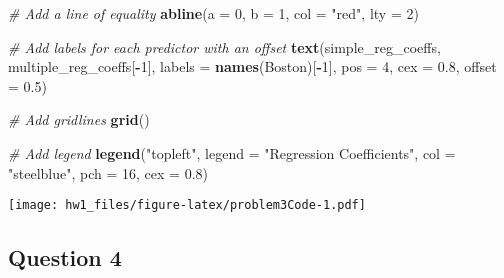 \documentclass[
]{article}
\newenvironment{Shaded}{\begin{snugshade}}{\end{snugshade}}
\newcommand{\AttributeTok}[1]{\textcolor[rgb]{0.13,0.29,0.53}{#1}}
\newcommand{\CommentTok}[1]{\textcolor[rgb]{0.56,0.35,0.01}{\textit{#1}}}
\newcommand{\DecValTok}[1]{\textcolor[rgb]{0.00,0.00,0.81}{#1}}
\newcommand{\FloatTok}[1]{\textcolor[rgb]{0.00,0.00,0.81}{#1}}
\newcommand{\FunctionTok}[1]{\textcolor[rgb]{0.13,0.29,0.53}{\textbf{#1}}}
\newcommand{\NormalTok}[1]{#1}
\newcommand{\SpecialCharTok}[1]{\textcolor[rgb]{0.81,0.36,0.00}{\textbf{#1}}}
\newcommand{\StringTok}[1]{\textcolor[rgb]{0.31,0.60,0.02}{#1}}
\begin{document}
\begin{Shaded}
\begin{Highlighting}[]
\CommentTok{\# Add a line of equality}
\FunctionTok{abline}\NormalTok{(}\AttributeTok{a =} \DecValTok{0}\NormalTok{, }\AttributeTok{b =} \DecValTok{1}\NormalTok{, }\AttributeTok{col =} \StringTok{"red"}\NormalTok{, }\AttributeTok{lty =} \DecValTok{2}\NormalTok{)}

\CommentTok{\# Add labels for each predictor with an offset}
\FunctionTok{text}\NormalTok{(simple\_reg\_coeffs, multiple\_reg\_coeffs[}\SpecialCharTok{{-}}\DecValTok{1}\NormalTok{], }\AttributeTok{labels =} \FunctionTok{names}\NormalTok{(Boston)[}\SpecialCharTok{{-}}\DecValTok{1}\NormalTok{], }\AttributeTok{pos =} \DecValTok{4}\NormalTok{, }\AttributeTok{cex =} \FloatTok{0.8}\NormalTok{, }\AttributeTok{offset =} \FloatTok{0.5}\NormalTok{)}

\CommentTok{\# Add gridlines}
\FunctionTok{grid}\NormalTok{()}

\CommentTok{\# Add legend}
\FunctionTok{legend}\NormalTok{(}\StringTok{"topleft"}\NormalTok{, }\AttributeTok{legend =} \StringTok{"Regression Coefficients"}\NormalTok{, }\AttributeTok{col =} \StringTok{"steelblue"}\NormalTok{, }\AttributeTok{pch =} \DecValTok{16}\NormalTok{, }\AttributeTok{cex =} \FloatTok{0.8}\NormalTok{)}
\end{Highlighting}
\end{Shaded}

\texttt{[image: hw1\_files/figure-latex/problem3Code-1.pdf]}

\hypertarget{question-4}{%
\subsection{Question 4}\label{question-4}}
\end{document}
